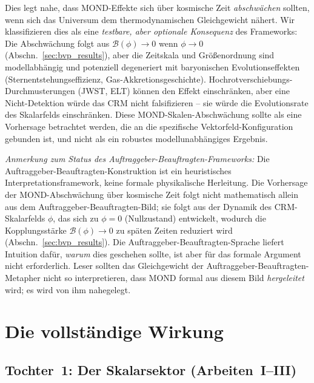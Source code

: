 \documentclass[aps,prd,twocolumn,superscriptaddress,nofootinbib]{revtex4-2}
\begin{document}
Dies legt nahe, dass MOND-Effekte sich \"uber kosmische Zeit \textit{abschw\"achen} sollten, wenn sich das Universum dem thermodynamischen Gleichgewicht n\"ahert. Wir klassifizieren dies als eine \emph{testbare, aber optionale Konsequenz} des Frameworks: Die Abschw\"achung folgt aus $\mathcal{B}(\phi) \to 0$ wenn $\phi \to 0$ (Abschn.~\ref{sec:bvp_results}), aber die Zeitskala und Gr\"o\ss{}enordnung sind modellabh\"angig und potenziell degeneriert mit baryonischen Evolutionseffekten (Sternentstehungseffizienz, Gas-Akkretionsgeschichte). Hochrotverschiebungs-Durchmusterungen (JWST, ELT) k\"onnen den Effekt einschr\"anken, aber eine Nicht-Detektion w\"urde das CRM nicht falsifizieren -- sie w\"urde die Evolutionsrate des Skalarfelds einschr\"anken. Diese MOND-Skalen-Abschw\"achung sollte als eine Vorhersage betrachtet werden, die an die spezifische Vektorfeld-Konfiguration gebunden ist, und nicht als ein robustes modellunabh\"angiges Ergebnis.

\textit{Anmerkung zum Status des Auftraggeber-Beauftragten-Frameworks:} Die Auftraggeber-Beauftragten-Konstruktion ist ein heuristisches Interpretationsframework, keine formale physikalische Herleitung. Die Vorhersage der MOND-Abschw\"achung \"uber kosmische Zeit folgt nicht mathematisch allein aus dem Auftraggeber-Beauftragten-Bild; sie folgt aus der Dynamik des CRM-Skalarfelds $\phi$, das sich zu $\phi = 0$ (Nullzustand) entwickelt, wodurch die Kopplungsst\"arke $\mathcal{B}(\phi) \to 0$ zu sp\"aten Zeiten reduziert wird (Abschn.~\ref{sec:bvp_results}). Die Auftraggeber-Beauftragten-Sprache liefert Intuition daf\"ur, \textit{warum} dies geschehen sollte, ist aber f\"ur das formale Argument nicht erforderlich. Leser sollten das Gleichgewicht der Auftraggeber-Beauftragten-Metapher nicht so interpretieren, dass MOND formal aus diesem Bild \textit{hergeleitet} wird; es wird von ihm nahegelegt.


\section{Die vollst\"andige Wirkung}
\label{sec:action}

\subsection{Tochter~1: Der Skalarsektor (Arbeiten~I--III)}
\end{document}

